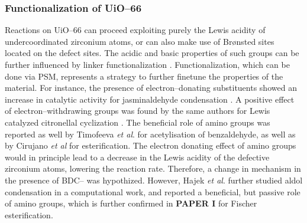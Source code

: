 \subsubsection*{Functionalization of UiO--66}
Reactions on UiO--66 can proceed exploiting purely the Lewis acidity of undercoordinated zirconium atoms, or can also make use of Br\o{}nsted sites located on the defect sites. The acidic and basic properties of such groups can be further influenced by linker functionalization \cite{kandiah2010synthesis, kandiah2010post, kim2012discovery}. Functionalization, which can be done via PSM, represents a strategy to further finetune the properties of the material. 
For instance, the presence of electron--donating substituents showed an increase in catalytic activity for jasminaldehyde condensation \cite{vermoortele2011amino}. A positive effect of electron--withdrawing groups was found by the same authors for Lewis catalyzed citronellal cyclization \cite{vermoortele2012electronic}. The beneficial role of amino groups was reported as well by Timofeeva \textit{et al}. \cite{timofeeva2014effects} for acetylisation of benzaldehyde, as well as by Cirujano \textit{et al} \cite{cirujano2015zirconium, cirujano2015conversion} for esterification. The electron donating effect of amino groups would in principle lead to a decrease in the Lewis acidity of the defective zirconium atoms, lowering the reaction rate. Therefore, a change in mechanism in the presence of BDC-- was hypothized. However, Hajek \textit{et al}. further studied aldol condensation in a computational work\cite{hajek2015mechanistic}, and reported a beneficial, but passive role of amino groups, which is further confirmed in \textbf{PAPER I} for Fischer esterification. 

